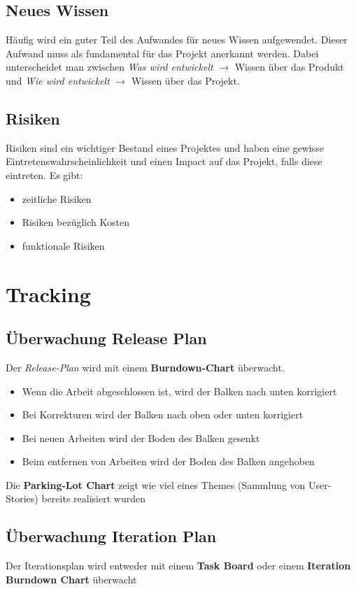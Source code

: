 \documentclass{report}
\theoremstyle{definition}
\theoremstyle{example}
\begin{document}
\subsection{Neues Wissen}
Häufig wird ein guter Teil des Aufwandes  für neues Wissen aufgewendet. Dieser Aufwand muss als fundamental für das Projekt anerkannt werden. Dabei unterscheidet man zwischen \textit{Was wird entwickelt} $\rightarrow$ Wissen über das Produkt und \textit{Wie wird entwickelt} $\rightarrow$ Wissen über das Projekt.

\subsection{Risiken}
Risiken sind ein wichtiger Bestand eines Projektes und haben eine gewisse Eintretenswahrscheinlichkeit und einen Impact auf das Projekt, falls diese eintreten. Es gibt:\\
\begin{itemize}
	\item zeitliche Risiken
	\item Risiken bezüglich Kosten
	\item funktionale Risiken
\end{itemize}

\section{Tracking}
\subsection{Überwachung Release Plan}
Der \textit{Release-Plan} wird mit einem \textbf{Burndown-Chart} überwacht.
\begin{itemize}
	\item Wenn die Arbeit abgeschlossen ist, wird der Balken nach unten korrigiert
	\item Bei Korrekturen wird der Balken nach oben oder unten korrigiert
	\item Bei neuen Arbeiten wird der Boden des Balken gesenkt
	\item Beim entfernen von Arbeiten wird der Boden des Balken angehoben
\end{itemize}

Die \textbf{Parking-Lot Chart} zeigt wie viel eines Themes (Sammlung von User-Stories) bereits realisiert wurden

\subsection{Überwachung Iteration Plan}
Der Iterationsplan wird entweder mit einem \textbf{Task Board} oder einem \textbf{Iteration Burndown Chart} überwacht
\end{document}
